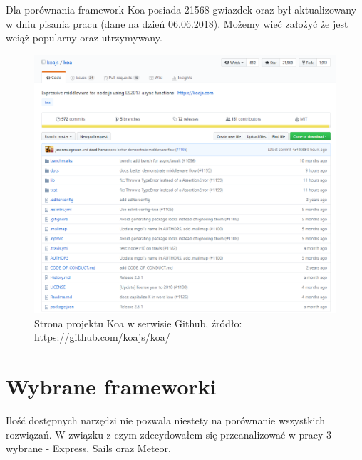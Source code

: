 \documentclass[12pt]{report}
\begin{document}
    Dla porównania framework Koa posiada 21568 gwiazdek oraz był aktualizowany w dniu pisania pracu (dane na dzień 06.06.2018).
    Możemy wieć założyć że jest wciąż popularny oraz utrzymywany.
    \begin{figure}[!hb]
      \centering
      \includegraphics[width=\textwidth,height=\textheight,keepaspectratio]{koa.png} 
      \caption{Strona projektu Koa w serwisie Github, źródło: https://github.com/koajs/koa/}
    \end{figure}

  \section{Wybrane frameworki}
    Ilość dostępnych narzędzi nie pozwala niestety na porównanie wszystkich rozwiązań.
    W związku z czym zdecydowałem się przeanalizować w pracy 3 wybrane - Express, Sails oraz Meteor.
\end{document}
